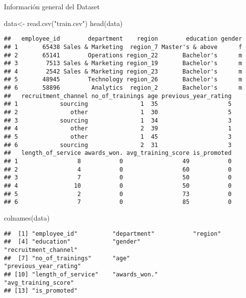 \documentclass[
]{article}
\newenvironment{Shaded}{\begin{snugshade}}{\end{snugshade}}
\newcommand{\FunctionTok}[1]{\textcolor[rgb]{0.00,0.00,0.00}{#1}}
\newcommand{\NormalTok}[1]{#1}
\newcommand{\OtherTok}[1]{\textcolor[rgb]{0.56,0.35,0.01}{#1}}
\newcommand{\StringTok}[1]{\textcolor[rgb]{0.31,0.60,0.02}{#1}}
\begin{document}
Información general del Dataset

\begin{Shaded}
\begin{Highlighting}[]
\NormalTok{data}\OtherTok{\textless{}{-}} \FunctionTok{read.csv}\NormalTok{(}\StringTok{"train.csv"}\NormalTok{)}
\FunctionTok{head}\NormalTok{(data)}
\end{Highlighting}
\end{Shaded}

\begin{verbatim}
##   employee_id        department    region        education gender
## 1       65438 Sales & Marketing  region_7 Master's & above      f
## 2       65141        Operations region_22       Bachelor's      m
## 3        7513 Sales & Marketing region_19       Bachelor's      m
## 4        2542 Sales & Marketing region_23       Bachelor's      m
## 5       48945        Technology region_26       Bachelor's      m
## 6       58896         Analytics  region_2       Bachelor's      m
##   recruitment_channel no_of_trainings age previous_year_rating
## 1            sourcing               1  35                    5
## 2               other               1  30                    5
## 3            sourcing               1  34                    3
## 4               other               2  39                    1
## 5               other               1  45                    3
## 6            sourcing               2  31                    3
##   length_of_service awards_won. avg_training_score is_promoted
## 1                 8           0                 49           0
## 2                 4           0                 60           0
## 3                 7           0                 50           0
## 4                10           0                 50           0
## 5                 2           0                 73           0
## 6                 7           0                 85           0
\end{verbatim}

\begin{Shaded}
\begin{Highlighting}[]
\FunctionTok{colnames}\NormalTok{(data)}
\end{Highlighting}
\end{Shaded}

\begin{verbatim}
##  [1] "employee_id"          "department"           "region"              
##  [4] "education"            "gender"               "recruitment_channel" 
##  [7] "no_of_trainings"      "age"                  "previous_year_rating"
## [10] "length_of_service"    "awards_won."          "avg_training_score"  
## [13] "is_promoted"
\end{verbatim}
\end{document}
